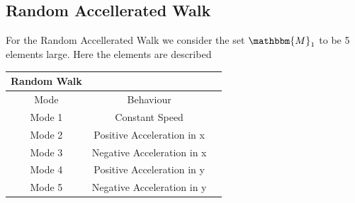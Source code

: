 \documentclass[twocolumn]{article}
\begin{document}
    \subsection*{Random Accellerated Walk}
    For the Random Accellerated Walk we consider the set $\mathbbm{M}_{1}$ to be 5 elements large. 
    Here the elements are described
    \begin{center}
        \begin{tabular}{||c||c |c |}%
            \hline
             Random Walk  \\
            \hline\hline
             Mode & Behaviour  \\ [0.5ex]
            \hline\hline
            Mode 1 & Constant Speed \\
            \hline
            Mode 2  & Positive Acceleration in x  \\
            \hline
            Mode 3  & Negative Acceleration in x  \\
            \hline
            Mode 4  & Positive Acceleration in y  \\
            \hline
            Mode 5  & Negative Acceleration in y   \\ [1ex]
            \hline
        \end{tabular}
    \end{center}
\end{document}
